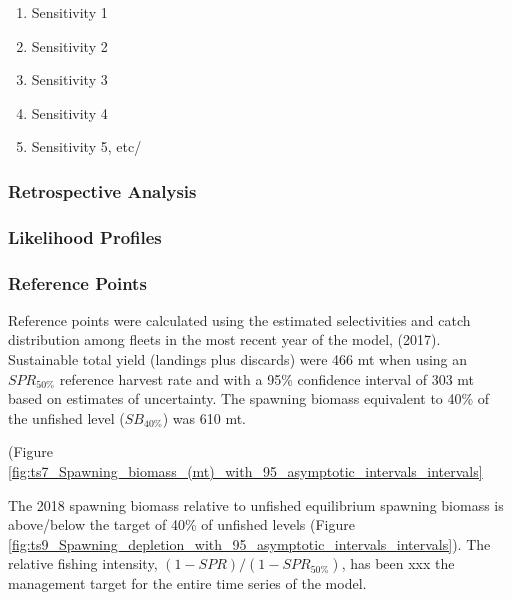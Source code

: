 \documentclass[12pt,]{article}
\begin{document}
\begin{enumerate}

  \item Sensitivity 1
  
  \item Sensitivity 2
  
  \item Sensitivity 3
  
  \item Sensitivity 4
  
  \item Sensitivity 5, etc/
  
  
\end{enumerate}

\hypertarget{retrospective-analysis}{%
\subsubsection{Retrospective Analysis}\label{retrospective-analysis}}

\hypertarget{likelihood-profiles}{%
\subsubsection{Likelihood Profiles}\label{likelihood-profiles}}

\hypertarget{reference-points-1}{%
\subsubsection{Reference Points}\label{reference-points-1}}

Reference points were calculated using the estimated selectivities and
catch distribution among fleets in the most recent year of the model,
(2017). Sustainable total yield (landings plus discards) were 466 mt
when using an \(SPR_{50\%}\) reference harvest rate and with a 95\%
confidence interval of 303 mt based on estimates of uncertainty. The
spawning biomass equivalent to 40\% of the unfished level
(\(SB_{40\%}\)) was 610 mt.

(Figure
\ref{fig:ts7_Spawning_biomass_(mt)_with_95_asymptotic_intervals_intervals}

The 2018 spawning biomass relative to unfished equilibrium spawning
biomass is above/below the target of 40\% of unfished levels (Figure
\ref{fig:ts9_Spawning_depletion_with_95_asymptotic_intervals_intervals}).
The relative fishing intensity, \((1-SPR)/(1-SPR_{50\%})\), has been xxx
the management target for the entire time series of the model.
\end{document}
